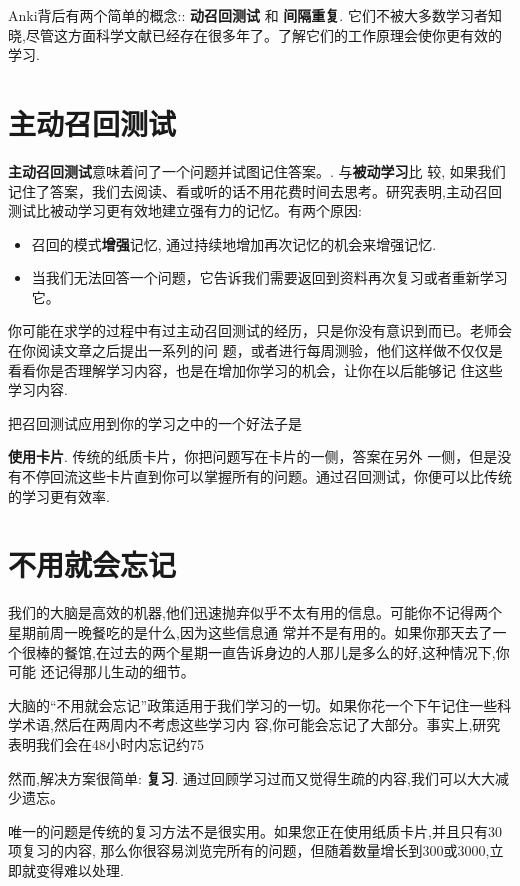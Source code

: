 \documentclass[a4paper]{book}
\begin{document}
	Anki背后有两个简单的概念:: \textbf{动召回测试 }和 \textbf{间隔重复}. 它们不被大多数学习者知晓,尽管这方面科学文献已经存在很多年了。了解它们的工作原理会使你更有效的学习.
	
	\section{主动召回测试}
	\textbf{主动召回测试}意味着问了一个问题并试图记住答案。. 与\textbf{被动学习}比 较, 如果我们记住了答案，我们去阅读、看或听的话不用花费时间去思考。研究表明,主动召回测试比被动学习更有效地建立强有力的记忆。有两个原因:
	
	\begin{itemize}
		\itemsep1pt\parskip0pt
		\item 召回的模式\textbf{增强}记忆, 通过持续地增加再次记忆的机会来增强记忆.
		\item 当我们无法回答一个问题，它告诉我们需要返回到资料再次复习或者重新学习它。
	\end{itemize}
	
	你可能在求学的过程中有过主动召回测试的经历，只是你没有意识到而已。老师会在你阅读文章之后提出一系列的问 题，或者进行每周测验，他们这样做不仅仅是看看你是否理解学习内容，也是在增加你学习的机会，让你在以后能够记 住这些学习内容.
	
	把召回测试应用到你的学习之中的一个好法子是
	
	\textbf{使用卡片}. 传统的纸质卡片，你把问题写在卡片的一侧，答案在另外 一侧，但是没有不停回流这些卡片直到你可以掌握所有的问题。通过召回测试，你便可以比传统的学习更有效率.
	
	\section{不用就会忘记}
	
	我们的大脑是高效的机器,他们迅速抛弃似乎不太有用的信息。可能你不记得两个星期前周一晚餐吃的是什么,因为这些信息通 常并不是有用的。如果你那天去了一个很棒的餐馆,在过去的两个星期一直告诉身边的人那儿是多么的好,这种情况下,你可能 还记得那儿生动的细节。
	
	大脑的“不用就会忘记”政策适用于我们学习的一切。如果你花一个下午记住一些科学术语,然后在两周内不考虑这些学习内 容,你可能会忘记了大部分。事实上,研究表明我们会在48小时内忘记约75%
	
	然而,解决方案很简单: \textbf{复习}. 通过回顾学习过而又觉得生疏的内容,我们可以大大减少遗忘。
	
	唯一的问题是传统的复习方法不是很实用。如果您正在使用纸质卡片,并且只有30项复习的内容, 那么你很容易浏览完所有的问题，但随着数量增长到300或3000,立即就变得难以处理.
	
\end{document}
